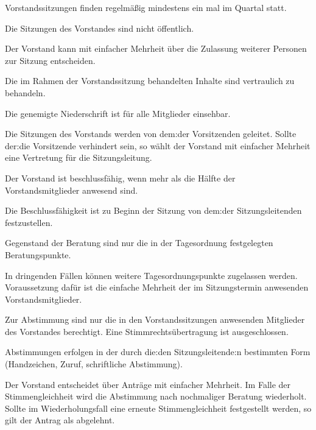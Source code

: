 \begin{gfvorstand}

  Vorstandssitzungen finden regelmäßig mindestens ein mal im Quartal statt.

  Die Sitzungen des Vorstandes sind nicht öffentlich.

  Der Vorstand kann mit einfacher Mehrheit über die Zulassung weiterer Personen zur Sitzung entscheiden.

  Die im Rahmen der Vorstandssitzung behandelten Inhalte sind vertraulich zu behandeln.

  Die genemigte Niederschrift ist für alle Mitglieder einsehbar.

  Die Sitzungen des Vorstands werden von dem:der Vorsitzenden geleitet. Sollte der:die Vorsitzende verhindert sein, so wählt der Vorstand mit einfacher Mehrheit eine Vertretung für die Sitzungsleitung.


  Der Vorstand ist beschlussfähig, wenn mehr als die Hälfte der Vorstandsmitglieder anwesend sind.

  Die Beschlussfähigkeit ist zu Beginn der Sitzung von dem:der Sitzungsleitenden festzustellen.


  Gegenstand der Beratung sind nur die in der Tagesordnung festgelegten Beratungspunkte.

  In dringenden Fällen können weitere Tagesordnungspunkte zugelassen werden. Voraussetzung dafür ist die einfache Mehrheit der im Sitzungstermin anwesenden Vorstandsmitglieder.


  Zur Abstimmung sind nur die in den Vorstandssitzungen anwesenden Mitglieder des Vorstandes berechtigt. Eine Stimmrechtsübertragung ist ausgeschlossen.

  Abstimmungen erfolgen in der durch die:den Sitzungsleitende:n bestimmten Form (Handzeichen, Zuruf, schriftliche Abstimmung).

  Der Vorstand entscheidet über Anträge mit einfacher Mehrheit. Im Falle der Stimmengleichheit wird die Abstimmung nach nochmaliger Beratung wiederholt. Sollte im Wiederholungsfall eine erneute Stimmengleichheit festgestellt werden, so gilt der Antrag als abgelehnt.



\end{gfvorstand}
